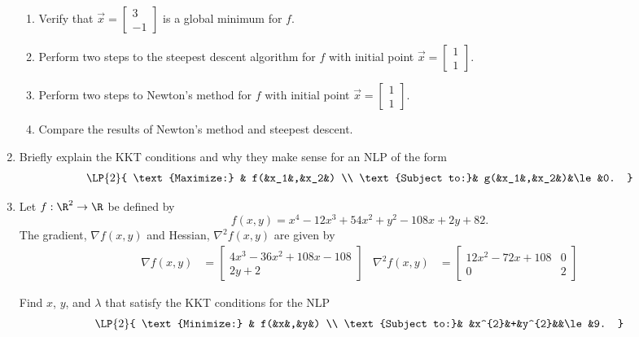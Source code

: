 \begin{enumerate}
\begin{enumerate}
  \item  Verify that \(\Vec{x}=\begin{bmatrix} 3\\-1 \end{bmatrix}\) is a global minimum for \(f\).
  \item  Perform two steps to the steepest descent algorithm for \(f\) with initial point
\(\Vec{x}=\begin{bmatrix} 1\\1 \end{bmatrix}\).
\item  Perform two steps to Newton's method for \(f\) with initial point
\(\Vec{x}=\begin{bmatrix} 1\\1 \end{bmatrix}\).
\item Compare the results of Newton's method and steepest descent.
\end{enumerate}
\clearpage
\item Briefly explain the KKT conditions and why they make sense for an NLP of the form
  \begin{align*}
    \LP{2}{
      \text{Maximize:}  & f(&x_1&,&x_2&) \\
      \text{Subject to:}& g(&x_1&,&x_2&)&\le&0.
    }
  \end{align*}
\item 
  Let \(f:\R^{2}\to\R\) be defined by
\begin{equation*}
  f(x,y)=x^{4}-12x^{3}+54x^{2}+y^{2}-108x+2y+82.
\end{equation*}
The gradient, \(\nabla f(x,y)\)
and Hessian,  \(\nabla^{2}f(x,y)\)
are given by
\begin{align*}
  \nabla    f(x,y)&=
  \begin{bmatrix}
  4 x^3-36 x^2+108 x-108\\2 y+2  
  \end{bmatrix}
&
  \nabla^{2}f(x,y)&=
  \begin{bmatrix}
 12 x^2-72 x+108 & 0 \\
          0      & 2 
  \end{bmatrix}
%
\end{align*}

Find \(x\), \(y\), and \(\lambda\) that satisfy the KKT conditions for the NLP
  \begin{align*}
    \LP{2}{
      \text{Minimize:}  & f(&x&,&y&) \\
      \text{Subject to:}&   &x^{2}&+&y^{2}&&\le&9.
    }
  \end{align*}

\end{enumerate}
